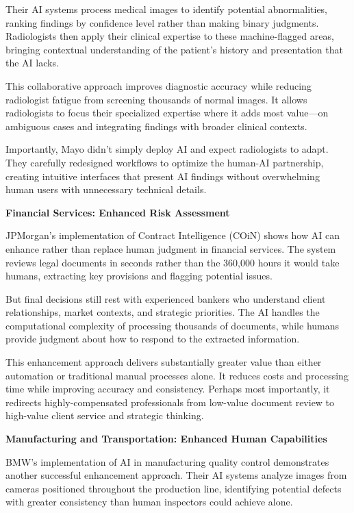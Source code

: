 \documentclass[
  Letterpaper,
]{scrbook}
\begin{document}
Their AI systems process medical images to identify potential
abnormalities, ranking findings by confidence level rather than making
binary judgments. Radiologists then apply their clinical expertise to
these machine-flagged areas, bringing contextual understanding of the
patient's history and presentation that the AI lacks.

This collaborative approach improves diagnostic accuracy while reducing
radiologist fatigue from screening thousands of normal images. It allows
radiologists to focus their specialized expertise where it adds most
value---on ambiguous cases and integrating findings with broader
clinical contexts.

Importantly, Mayo didn't simply deploy AI and expect radiologists to
adapt. They carefully redesigned workflows to optimize the human-AI
partnership, creating intuitive interfaces that present AI findings
without overwhelming human users with unnecessary technical details.

\textbf{Financial Services: Enhanced Risk Assessment}

JPMorgan's implementation of Contract Intelligence (COiN) shows how AI
can enhance rather than replace human judgment in financial services.
The system reviews legal documents in seconds rather than the 360,000
hours it would take humans, extracting key provisions and flagging
potential issues.

But final decisions still rest with experienced bankers who understand
client relationships, market contexts, and strategic priorities. The AI
handles the computational complexity of processing thousands of
documents, while humans provide judgment about how to respond to the
extracted information.

This enhancement approach delivers substantially greater value than
either automation or traditional manual processes alone. It reduces
costs and processing time while improving accuracy and consistency.
Perhaps most importantly, it redirects highly-compensated professionals
from low-value document review to high-value client service and
strategic thinking.

\textbf{Manufacturing and Transportation: Enhanced Human Capabilities}

BMW's implementation of AI in manufacturing quality control demonstrates
another successful enhancement approach. Their AI systems analyze images
from cameras positioned throughout the production line, identifying
potential defects with greater consistency than human inspectors could
achieve alone.
\end{document}
